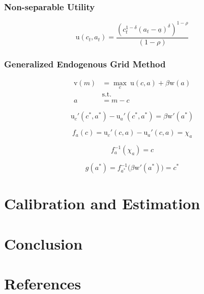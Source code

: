 \documentclass{article}
\newcommand{\DiscFac}{\beta}
\newcommand{\uFunc}{\mathrm{u}}
\newcommand{\CRRA}{\rho}
\newcommand{\vFunc}{\mathrm{v}}
\newcommand{\aNrm}{a}
\newcommand{\cNrm}{c}
\newcommand{\wealthShare}{\delta}
\newcommand{\wFunc}{\mathrm{w}}
\newcommand{\aRat}{a}
\newcommand{\mRat}{m}
\newcommand{\xFer}{\chi}
\begin{document}
\subsubsection{Non-separable Utility}\label{Non-separable Utility}

\begin{equation}
\uFunc(\cNrm_{t}, \aNrm_{t}) = \frac{(\cNrm_{t}^{1-\wealthShare} (\aNrm_{t}- \underline\aNrm)^\wealthShare)^{1-\CRRA}}{(1-\CRRA)}
\end{equation}

\subsubsection{Generalized Endogenous Grid Method}\label{Generalized Endogenous Grid Method}

\begin{equation}
\begin{align}
  \vFunc(\mRat) & = \max_{\cNrm} ~ \uFunc(\cNrm, \aNrm) + \DiscFac \wFunc(\aRat) 
  \\ & \text{s.t.} 
  \\ \aNrm & = \mRat-\cNrm
\end{align}
\end{equation}

\begin{equation}
\uFunc_{c}'(\cNrm^*, \aNrm^*) - \uFunc_{a}'(\cNrm^*, \aNrm^*) = \DiscFac \wFunc'(\aNrm^*)
\end{equation}

\begin{equation}
f_{a}(\cNrm) = \uFunc_{c}'(\cNrm, \aNrm) - \uFunc_{a}'(\cNrm, \aNrm) = \xFer_{a}
\end{equation}

\begin{equation}
f_{a}^{-1}(\xFer_{a}) = \cNrm
\end{equation}

\begin{equation}
g(\aNrm^*) = f_{a^*}^{-1} \big( \DiscFac \wFunc'(\aNrm^*) \big) = \cNrm^*
\end{equation}

\section{Calibration and Estimation}\label{Calibration and Estimation}

\section{Conclusion}\label{Conclusion}

\section{References}\label{References}

\cite{Carroll_2000}
\cite{Carroll_1998}
\cite{Michaillat_2021}
\cite{Auclert_2021}
\cite{Mian_2020}
\cite{Kaplan_2018}
\cite{Auclert_2020}
\cite{Cagetti_2003}





\end{document}
